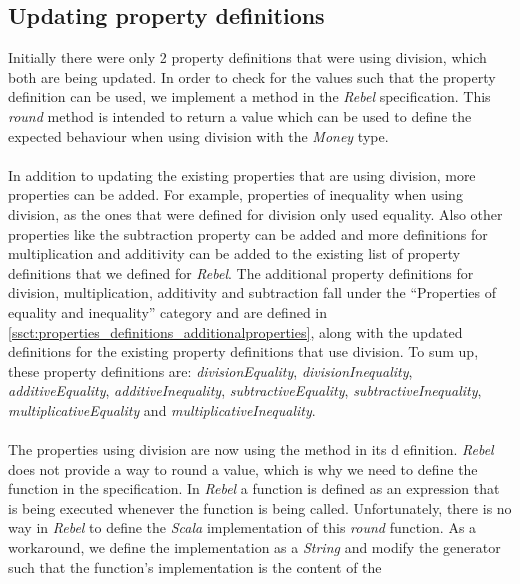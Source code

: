 \subsection{Updating property definitions}
Initially there were only 2 property definitions that were using division, which both are being updated. In order to check for the values such that the property definition can be used, we implement a  method in the \textit{Rebel} specification. This \textit{round} method is intended to return a value which can be used to define the expected behaviour when using division with the \textit{Money} type.\\
\\
In addition to updating the existing properties that are using division, more properties can be added. For example, properties of inequality when using division, as the ones that were defined for
division only used equality. Also other properties like the subtraction property can
be added and more definitions for multiplication and additivity
can be added to the existing list of property definitions that we defined for \textit{Rebel}. The
additional property definitions for division, multiplication, additivity and
subtraction fall under the ``Properties of equality and inequality'' category
and are defined in \autoref{ssct:properties_definitions_additionalproperties},
along with the updated definitions for the existing property definitions that
use division. To sum up, these property definitions are: \textit{divisionEquality}, \textit{divisionInequality}, \textit{additiveEquality}, \textit{additiveInequality}, \textit{subtractiveEquality}, \textit{subtractiveInequality}, \textit{multiplicativeEquality} and \textit{multiplicativeInequality}.\\
\\
The properties using division are now using the  method in its d
efinition. \textit{Rebel} does not provide a way to round a value, which is why
we need to define the function in the specification. In \textit{Rebel} a
function is defined as an expression that is being executed whenever the
function is being called. Unfortunately, there is no way in \textit{Rebel} to
define the \textit{Scala} implementation of this \textit{round} function. As a
workaround, we define the implementation as a \textit{String} and modify the
generator such that the function's implementation is the content of the
